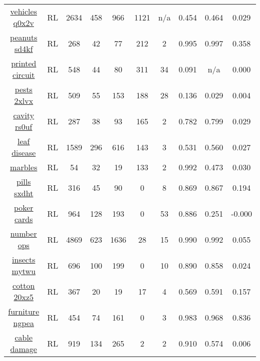 \begin{longtable}{|| c | c | c c c | c c | c c c ||}
\cline{1-10}
\href{https://app.roboflow.com/roboflow-100/vehicles-q0x2v/1}{vehicles q0x2v} & RL & 2634 & 458 & 966 & 1121 & n/a & 0.454 & 0.464 & 0.029 \\
\cline{1-10}
\href{https://app.roboflow.com/roboflow-100/peanuts-sd4kf/1}{peanuts sd4kf} & RL & 268 & 42 & 77 & 212 & 2 & 0.995 & 0.997 & 0.358 \\
\cline{1-10}
\href{https://app.roboflow.com/roboflow-100/printed-circuit-board/3}{printed circuit} & RL & 548 & 44 & 80 & 311 & 34 & 0.091 & n/a & 0.000 \\
\cline{1-10}
\href{https://app.roboflow.com/roboflow-100/pests-2xlvx/1}{pests 2xlvx} & RL & 509 & 55 & 153 & 188 & 28 & 0.136 & 0.029 & 0.004 \\
\cline{1-10}
\href{https://app.roboflow.com/roboflow-100/cavity-rs0uf/1}{cavity rs0uf} & RL & 287 & 38 & 93 & 165 & 2 & 0.782 & 0.799 & 0.029 \\
\cline{1-10}
\href{https://app.roboflow.com/roboflow-100/leaf-disease-nsdsr/1}{leaf disease} & RL & 1589 & 296 & 616 & 143 & 3 & 0.531 & 0.560 & 0.027 \\
\cline{1-10}
\href{https://app.roboflow.com/roboflow-100/marbles/1}{marbles} & RL & 54 & 32 & 19 & 133 & 2 & 0.992 & 0.473 & 0.030 \\
\cline{1-10}
\href{https://app.roboflow.com/roboflow-100/pills-sxdht/1}{pills sxdht} & RL & 316 & 45 & 90 & 0 & 8 & 0.869 & 0.867 & 0.194 \\
\cline{1-10}
\href{https://app.roboflow.com/roboflow-100/poker-cards-cxcvz/1}{poker cards} & RL & 964 & 128 & 193 & 0 & 53 & 0.886 & 0.251 & -0.000 \\
\cline{1-10}
\href{https://app.roboflow.com/roboflow-100/number-ops/1}{number ops} & RL & 4869 & 623 & 1636 & 28 & 15 & 0.990 & 0.992 & 0.055 \\
\cline{1-10}
\href{https://app.roboflow.com/roboflow-100/insects-mytwu/1}{insects mytwu} & RL & 696 & 100 & 199 & 0 & 10 & 0.890 & 0.858 & 0.024 \\
\cline{1-10}
\href{https://app.roboflow.com/roboflow-100/cotton-20xz5/1}{cotton 20xz5} & RL & 367 & 20 & 19 & 17 & 4 & 0.569 & 0.591 & 0.157 \\
\cline{1-10}
\href{https://app.roboflow.com/roboflow-100/furniture-ngpea/1}{furniture ngpea} & RL & 454 & 74 & 161 & 0 & 3 & 0.983 & 0.968 & 0.836 \\
\cline{1-10}
\href{https://app.roboflow.com/roboflow-100/cable-damage/1}{cable damage} & RL & 919 & 134 & 265 & 2 & 2 & 0.910 & 0.574 & 0.006 \\

\end{longtable}
